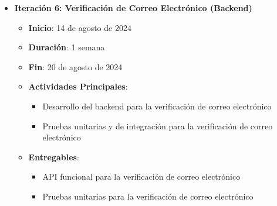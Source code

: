 \documentclass{article}
\begin{document}
\begin{itemize}
\begin{itemize}
              \item \textbf{Iteración 6: Verificación de Correo Electrónico (Backend)}
                    \begin{itemize}
                        \item \textbf{Inicio}: 14 de agosto de 2024
                        \item \textbf{Duración}: 1 semana
                        \item \textbf{Fin}: 20 de agosto de 2024
                        \item \textbf{Actividades Principales}:
                              \begin{itemize}
                                  \item Desarrollo del backend para la verificación de correo electrónico
                                  \item Pruebas unitarias y de integración para la verificación de correo electrónico
                              \end{itemize}
                        \item \textbf{Entregables}:
                              \begin{itemize}
                                  \item API funcional para la verificación de correo electrónico
                                  \item Pruebas unitarias para la verificación de correo electrónico
                              \end{itemize}
                    \end{itemize}
          \end{itemize}


\end{itemize}
\end{document}
